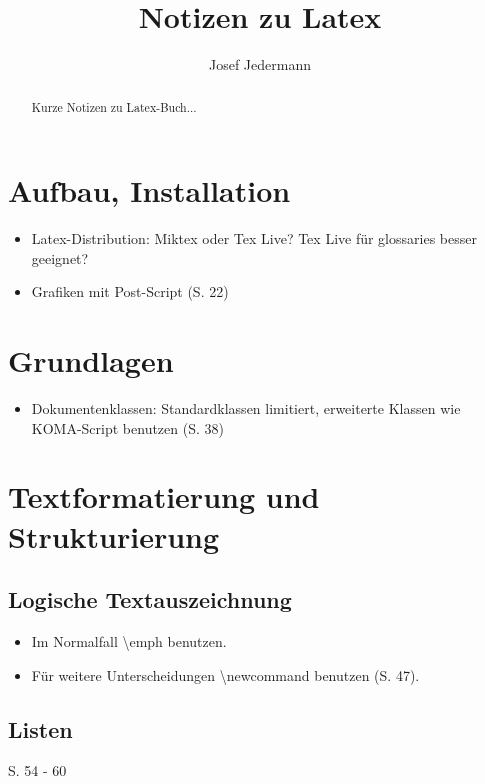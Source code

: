 \documentclass[10pt,a4paper]{article}
\author{Josef Jedermann}
\title{Notizen zu Latex}
\begin{document}
\maketitle

\begin{abstract}
Kurze Notizen zu Latex-Buch...
\end{abstract}

\tableofcontents

\newpage

\section{Aufbau, Installation}

\begin{itemize}
\item
Latex-Distribution: Miktex oder Tex Live? Tex Live für glossaries besser geeignet?
\item
Grafiken mit Post-Script (S. 22)
\end{itemize}

\section{Grundlagen}

\begin{itemize}
\item
Dokumentenklassen: Standardklassen limitiert, erweiterte Klassen wie KOMA-Script benutzen (S. 38)
\end{itemize}

\section{Textformatierung und Strukturierung}

\subsection{Logische Textauszeichnung}
\begin{itemize}
\item
Im Normalfall \textbackslash emph benutzen.
\item
Für weitere Unterscheidungen \textbackslash newcommand benutzen (S. 47).
\end{itemize}

\subsection{Listen}
S. 54 - 60
\end{document}
